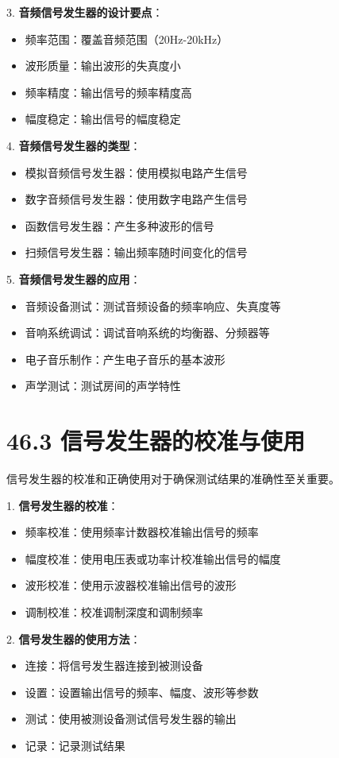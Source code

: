 \documentclass[12pt,UTF8]{ctexbook}
\begin{document}
3. \textbf{音频信号发生器的设计要点}：
   \begin{itemize}[leftmargin=3.5em]
   \item 频率范围：覆盖音频范围（20Hz-20kHz）
   \item 波形质量：输出波形的失真度小
   \item 频率精度：输出信号的频率精度高
   \item 幅度稳定：输出信号的幅度稳定
   \end{itemize}

4. \textbf{音频信号发生器的类型}：
   \begin{itemize}[leftmargin=3.5em]
   \item 模拟音频信号发生器：使用模拟电路产生信号
   \item 数字音频信号发生器：使用数字电路产生信号
   \item 函数信号发生器：产生多种波形的信号
   \item 扫频信号发生器：输出频率随时间变化的信号
   \end{itemize}

5. \textbf{音频信号发生器的应用}：
   \begin{itemize}[leftmargin=3.5em]
   \item 音频设备测试：测试音频设备的频率响应、失真度等
   \item 音响系统调试：调试音响系统的均衡器、分频器等
   \item 电子音乐制作：产生电子音乐的基本波形
   \item 声学测试：测试房间的声学特性
   \end{itemize}

\section*{46.3 信号发生器的校准与使用}

信号发生器的校准和正确使用对于确保测试结果的准确性至关重要。

1. \textbf{信号发生器的校准}：
   \begin{itemize}[leftmargin=3.5em]
   \item 频率校准：使用频率计数器校准输出信号的频率
   \item 幅度校准：使用电压表或功率计校准输出信号的幅度
   \item 波形校准：使用示波器校准输出信号的波形
   \item 调制校准：校准调制深度和调制频率
   \end{itemize}

2. \textbf{信号发生器的使用方法}：
   \begin{itemize}[leftmargin=3.5em]
   \item 连接：将信号发生器连接到被测设备
   \item 设置：设置输出信号的频率、幅度、波形等参数
   \item 测试：使用被测设备测试信号发生器的输出
   \item 记录：记录测试结果
   \end{itemize}
\end{document}
